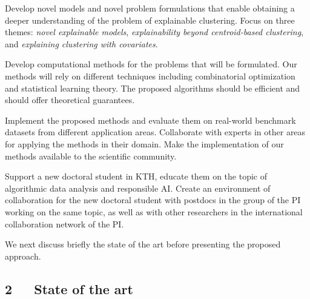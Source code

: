 \documentclass[a4paper,11pt]{article}
\begin{document}
\vspace{-2mm}
\begin{description}
\setlength{\itemsep}{-4pt}
\item[{Models and problems:}]
Develop novel models and novel problem formulations that enable 
obtaining a deeper understanding of the problem of explainable clustering.
Focus on three themes: 
\emph{novel explainable models}, 
\emph{explainability beyond centroid-based clustering}, and 
\emph{explaining clustering with covariates}.

\item[{Algorithms:}]
Develop computational methods for the problems that will be formulated.
Our methods will rely on different techniques
including combinatorial optimization and statistical learning theory.
The proposed algorithms should be efficient and should offer theoretical guarantees.

\item[{Empirical evaluation and outreach:}]
Implement the proposed methods and evaluate them on 
real-world benchmark datasets from different application areas.
Collaborate with experts in other areas for applying the methods in their domain.
Make the implementation of our methods available to the scientific community.

\item[{Education in KTH:}]
Support a new doctoral student in KTH, 
educate them on the topic of algorithmic data analysis and responsible AI. 
Create an environment of collaboration for the new doctoral student 
with postdocs in the group of the PI working on the same topic, 
as well as with other researchers in the international collaboration network of the PI.
\end{description}

\vspace{-2mm}
\noindent
We next discuss briefly the state of the art
before presenting the proposed approach.

\subsection*{2~~~State of the art}

\end{document}
